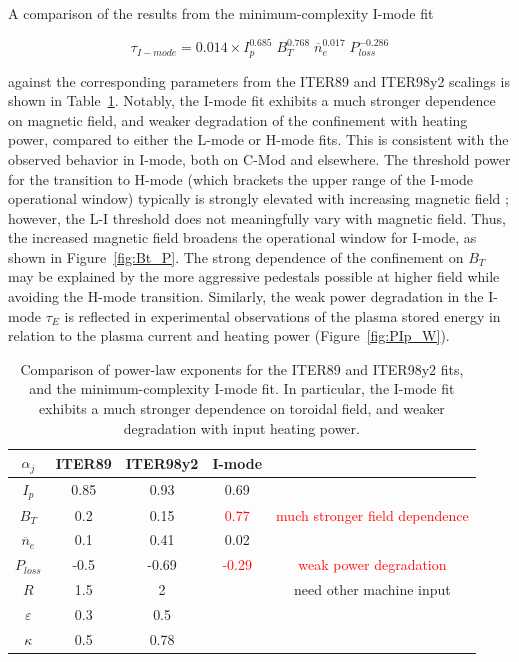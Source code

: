 \documentclass[12pt]{iopart}
\begin{document}
A comparison of the results from the minimum-complexity I-mode fit

\begin{equation}\label{eq:tau_I}
 \tau_{I-mode} = 0.014 \times I_p^{0.685} \; B_T^{0.768} \; \overline{n}_e^{0.017} \; P_{loss}^{-0.286}
\end{equation}

 against the corresponding parameters from the ITER89 and ITER98y2 scalings is shown in Table~\ref{tab:compare}.  
Notably, the I-mode fit exhibits a much stronger dependence on magnetic field, and weaker degradation of the confinement with heating power, compared to either the L-mode or H-mode fits.
This is consistent with the observed behavior in I-mode, both on C-Mod and elsewhere.
The threshold power for the transition to H-mode (which brackets the upper range of the I-mode operational window) typically is strongly elevated with increasing magnetic field \cite{Martin2008}; however, the L-I threshold does not meaningfully vary with magnetic field.
Thus, the increased magnetic field broadens the operational window for I-mode, as shown in Figure~\ref{fig:Bt_P}.
The strong dependence of the confinement on $B_T$ may be explained by the more aggressive pedestals possible at higher field while avoiding the H-mode transition.
Similarly, the weak power degradation in the I-mode $\tau_E$ is reflected in experimental observations of the plasma stored energy in relation to the plasma current and heating power (Figure~\ref{fig:PIp_W}).

\begin{table}[ht]
 \centering
 \begin{tabular}{ccccc}
  \hline
  $\alpha_j$ & ITER89 & ITER98y2 & I-mode & \\
  \hline
  $I_p$ & 0.85 & 0.93 & 0.69 & \\
  $B_T$ & 0.2 & 0.15 & \textcolor{red}{0.77} & \small{\textcolor{red}{much stronger field dependence}}\\
  $\overline{n}_e$ & 0.1 & 0.41 & 0.02 & \\
  $P_{loss}$ & -0.5 & -0.69 & \textcolor{red}{-0.29} & \small{\textcolor{red}{weak power degradation}} \\
  $R$ & 1.5 & 2 &  & \small{need other machine input} \\
  $\varepsilon$ & 0.3 & 0.5 &  & \\
  $\kappa$ & 0.5 & 0.78 &  & \\
  \hline
 \end{tabular}
 \caption{Comparison of power-law exponents for the ITER89 and ITER98y2 fits, and the minimum-complexity I-mode fit.  In particular, the I-mode fit exhibits a much stronger dependence on toroidal field, and weaker degradation with input heating power.}
 \label{tab:compare}
\end{table}
\end{document}

